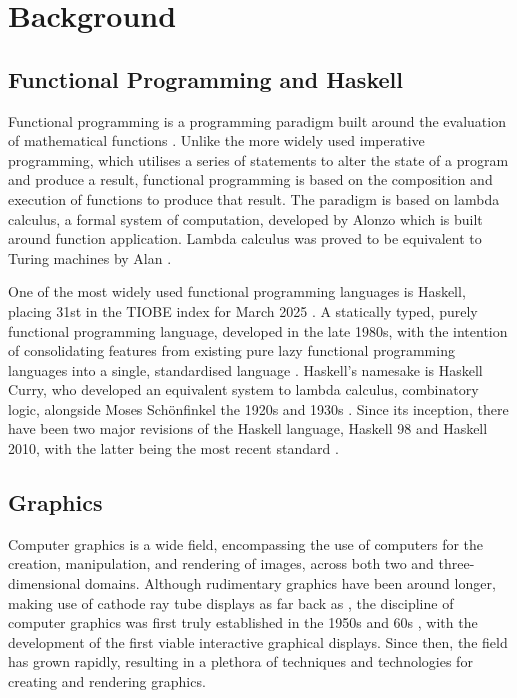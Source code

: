 \documentclass[../main.tex]{subfiles}
\begin{document}
\chapter{Background} \label{ch:background}
    \section{Functional Programming and Haskell}
        Functional programming is a programming paradigm built around the evaluation of
            mathematical functions \citep{fpPaulHudak}.
        Unlike the more widely used imperative programming, which utilises a series of
            statements to alter the state of a program and produce a result, functional
            programming is based on the composition and execution of functions to produce
            that result.
        The paradigm is based on lambda calculus, a formal system of computation,
            developed by Alonzo \citet{lambdaCalculus} which is built around function
            application.
        Lambda calculus was proved to be equivalent to Turing machines by Alan
            \citet{lambdaTuringComplete}.

        One of the most widely used functional programming languages is Haskell,
            placing 31st in the TIOBE index for March 2025 \citep{tiobeIndex}.
        A statically typed, purely functional programming language, developed in the
            late 1980s, with the intention of consolidating features from existing pure
            lazy functional programming languages into a single, standardised language
            \citep{haskellHistory}.
        Haskell's namesake is Haskell Curry, who developed an equivalent system to
            lambda calculus, combinatory logic, alongside Moses Schönfinkel the 1920s and
            1930s \citep{combinatoryLogic}.
        Since its inception, there have been two major revisions of the Haskell
            language, Haskell 98 and Haskell 2010, with the latter being the most recent
            standard \citep{haskell2010}.

    \section{Graphics}
        Computer graphics is a wide field, encompassing the use of computers for the
            creation, manipulation, and rendering of images, across both two and
            three-dimensional domains.
        Although rudimentary graphics have been around longer, making use of cathode
            ray tube displays as far back as \citet{crtBraun}, the discipline of computer
            graphics was first truly established in the 1950s and 60s \citep{graphics},
            with the development of the first viable interactive graphical displays.
        Since then, the field has grown rapidly, resulting in a plethora of techniques
            and technologies for creating and rendering graphics.
\end{document}
